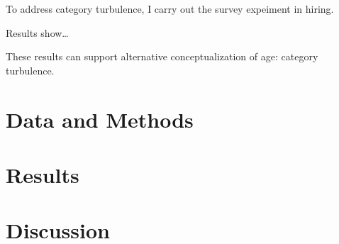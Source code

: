 \documentclass[
  letterpaper,
  DIV=11,
  numbers=noendperiod]{scrartcl}
\theoremstyle{paper}
\begin{document}
To address category turbulence, I carry out the survey expeiment in
hiring.

Results show\ldots{}

These results can support alternative conceptualization of age: category
turbulence.

\hypertarget{data-and-methods}{%
\section{Data and Methods}\label{data-and-methods}}

\hypertarget{results}{%
\section{Results}\label{results}}

\hypertarget{discussion}{%
\section*{Discussion}\label{discussion}}
\end{document}
